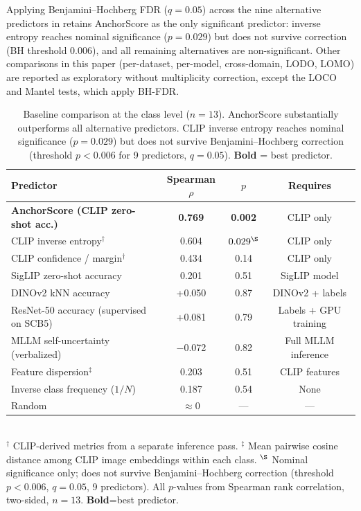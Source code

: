 \documentclass[a4paper,fleqn]{cas-sc}
\begin{document}
Applying Benjamini--Hochberg FDR ($q=0.05$) across the nine alternative predictors in  retains AnchorScore as the only significant predictor: inverse entropy reaches nominal significance ($p=0.029$) but does not survive correction (BH threshold $0.006$), and all remaining alternatives are non-significant. Other comparisons in this paper (per-dataset, per-model, cross-domain, LODO, LOMO) are reported as exploratory without multiplicity correction, except the LOCO and Mantel tests, which apply BH-FDR.

\begin{table}[t]
\caption{Baseline comparison at the class level ($n=13$). AnchorScore substantially outperforms all alternative predictors. CLIP inverse entropy reaches nominal significance ($p=0.029$) but does not survive Benjamini--Hochberg correction (threshold $p<0.006$ for 9 predictors, $q=0.05$). \textbf{Bold} = best predictor.}
\label{tab:baselines}
\centering
\footnotesize
\begin{tabular}{lccc}
\toprule
\textbf{Predictor} & \textbf{Spearman} $\rho$ & $p$ & \textbf{Requires} \\
\midrule
\textbf{AnchorScore (CLIP zero-shot acc.)} & \textbf{0.769} & \textbf{0.002} & CLIP only \\
CLIP inverse entropy$^\dagger$ & 0.604 & $0.029^\S$ & CLIP only \\
CLIP confidence / margin$^\dagger$ & 0.434 & 0.14 & CLIP only \\
\midrule
SigLIP zero-shot accuracy & 0.201 & 0.51 & SigLIP model \\
DINOv2 kNN accuracy & +0.050 & 0.87 & DINOv2 + labels \\
ResNet-50 accuracy (supervised on SCB5) & +0.081 & 0.79 & Labels + GPU training \\
\midrule
MLLM self-uncertainty (verbalized) & $-$0.072 & 0.82 & Full MLLM inference \\
\midrule
Feature dispersion$^\ddagger$ & 0.203 & 0.51 & CLIP features \\
Inverse class frequency ($1/N$) & 0.187 & 0.54 & None \\
Random & $\approx 0$ & --- & --- \\
\bottomrule
\end{tabular}
\\[2pt]
\footnotesize{$^\dagger$ CLIP-derived metrics from a separate inference pass. $^\ddagger$ Mean pairwise cosine distance among CLIP image embeddings within each class. $^\S$ Nominal significance only; does not survive Benjamini--Hochberg correction (threshold $p<0.006$, $q=0.05$, 9 predictors). All $p$-values from Spearman rank correlation, two-sided, $n=13$. \textbf{Bold}=best predictor.}
\end{table}
\end{document}
